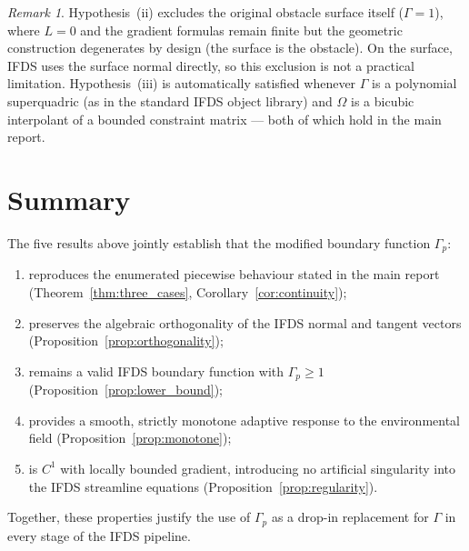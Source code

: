 \documentclass[11pt]{article}
\theoremstyle{remark}
\newtheorem*{remark}{Remark}
\newcommand{\G}{\Gamma}
\newcommand{\Gp}{\Gamma_p}
\newcommand{\Om}{\Omega}
\begin{document}
\begin{remark}
Hypothesis~(ii) excludes the original obstacle surface itself ($\G=1$), where $L=0$ and the gradient formulas remain finite but the geometric construction degenerates by design (the surface is the obstacle). On the surface, IFDS uses the surface normal directly, so this exclusion is not a practical limitation. Hypothesis~(iii) is automatically satisfied whenever $\G$ is a polynomial superquadric (as in the standard IFDS object library) and $\Om$ is a bicubic interpolant of a bounded constraint matrix --- both of which hold in the main report.
\end{remark}

\bigskip

\section*{Summary}

The five results above jointly establish that the modified boundary function $\Gp$:
\begin{enumerate}
    \item reproduces the enumerated piecewise behaviour stated in the main report (Theorem~\ref{thm:three_cases}, Corollary~\ref{cor:continuity});
    \item preserves the algebraic orthogonality of the IFDS normal and tangent vectors (Proposition~\ref{prop:orthogonality});
    \item remains a valid IFDS boundary function with $\Gp\ge 1$ (Proposition~\ref{prop:lower_bound});
    \item provides a smooth, strictly monotone adaptive response to the environmental field (Proposition~\ref{prop:monotone});
    \item is $C^{1}$ with locally bounded gradient, introducing no artificial singularity into the IFDS streamline equations (Proposition~\ref{prop:regularity}).
\end{enumerate}
Together, these properties justify the use of $\Gp$ as a drop-in replacement for $\G$ in every stage of the IFDS pipeline.
\end{document}
